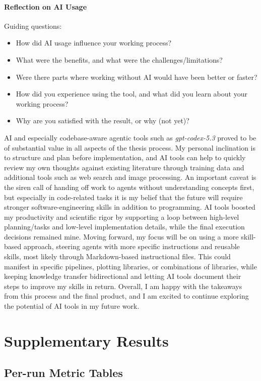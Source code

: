 \paragraph*{Reflection on AI Usage}
Guiding questions:
\begin{itemize}
  \item How did AI usage influence your working process?
  \item What were the benefits, and what were the challenges/limitations?
  \item Were there parts where working without AI would have been better or faster?
  \item How did you experience using the tool, and what did you learn about your working process?
  \item Why are you satisfied with the result, or why (not yet)?
\end{itemize}
AI and especially codebase-aware agentic tools such as \textit{gpt-codex-5.3} proved to be of substantial value in all aspects of the thesis process.
My personal inclination is to structure and plan before implementation, and AI tools can help to quickly review my own thoughts against existing literature through training data and additional tools such as web search and image processing.
An important caveat is the siren call of handing off work to agents without understanding concepts first, but especially in code-related tasks it is my belief that the future will require stronger software-engineering skills in addition to programming.
AI tools boosted my productivity and scientific rigor by supporting a loop between high-level planning/tasks and low-level implementation details, while the final execution decisions remained mine.
Moving forward, my focus will be on using a more skill-based approach, steering agents with more specific instructions and reusable skills, most likely through Markdown-based instructional files.
This could manifest in specific pipelines, plotting libraries, or combinations of libraries, while keeping knowledge transfer bidirectional and letting AI tools document their steps to improve my skills in return.
Overall, I am happy with the takeaways from this process and the final product, and I am excited to continue exploring the potential of AI tools in my future work.

\section{Supplementary Results}

\subsection{Per-run Metric Tables}




